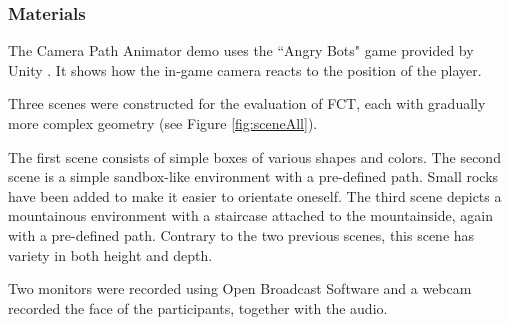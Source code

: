 \begin{verbatim}

\end{verbatim}
\subsubsection{Materials}
The Camera Path Animator \cite{unity_camTool} demo uses the ``Angry Bots" game provided by Unity \cite{angryBots}. It shows how the in-game camera reacts to the position of the player.


Three scenes were constructed for the evaluation of FCT, each with gradually more complex geometry (see Figure \ref{fig:sceneAll}). 

The first scene consists of simple boxes of various shapes and colors.
The second scene is a simple sandbox-like environment with a pre-defined path. Small rocks have been added to make it easier to orientate oneself.
The third scene depicts a mountainous environment with a staircase attached to the mountainside, again with a pre-defined path. Contrary to the two previous scenes, this scene has variety in both height and depth.


Two monitors were recorded using Open Broadcast Software \cite{obs_cam} and a webcam recorded the face of the participants, together with the audio.

